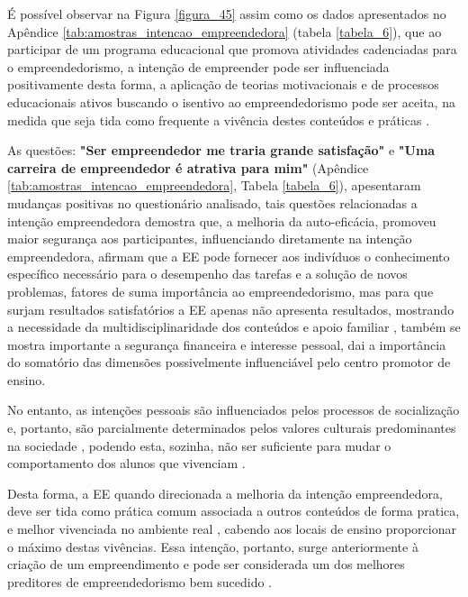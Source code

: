 É possível observar na Figura \ref{figura_45} assim como os dados apresentados no Apêndice \ref{tab:amostras_intencao_empreendedora} (tabela \ref{tabela_6}), que ao participar de um programa educacional que promova atividades cadenciadas para o empreendedorismo, a intenção de empreender pode ser influenciada positivamente desta forma, a aplicação de teorias motivacionais e de processos educacionais ativos buscando o isentivo ao empreendedorismo pode ser aceita, na medida que seja tida como frequente a vivência destes conteúdos e práticas \cite{fayolle_beyond_2014}.

As questões: \textbf{"Ser empreendedor me traria grande satisfação"} e \textbf{"Uma carreira de empreendedor é atrativa para mim"} (Apêndice \ref{tab:amostras_intencao_empreendedora}, Tabela \ref{tabela_6}), apesentaram mudanças positivas no questionário analisado, tais questões relacionadas a intenção empreendedora demostra que, a melhoria da auto-eficácia, promoveu maior segurança aos participantes, influenciando diretamente na intenção empreendedora,  afirmam que a EE pode fornecer aos indivíduos o conhecimento específico necessário para o desempenho das tarefas e a solução de novos problemas, fatores de suma importância ao empreendedorismo, mas para que surjam resultados satisfatórios a EE apenas não apresenta resultados, mostrando a necessidade da multidisciplinaridade dos conteúdos e apoio familiar \cite{edelman_impact_2016}, também se mostra importante a segurança financeira e interesse pessoal, dai a importância do somatório das dimensões possivelmente influenciável pelo centro promotor de ensino.


No entanto, as intenções pessoais são influenciados pelos processos de socialização e, portanto, são parcialmente determinados pelos valores culturais predominantes na sociedade \cite{schwartz_les_2006}, podendo esta, sozinha, não ser suficiente para mudar o comportamento dos alunos que vivenciam \cite{adelaja_students_2018}. 

Desta forma, a EE quando direcionada a melhoria da intenção empreendedora, deve ser tida como prática comum associada a outros conteúdos de forma pratica, e melhor vivenciada no ambiente real \cite{damanpour_phases_2006}, cabendo aos locais de ensino proporcionar o máximo destas vivências. Essa intenção, portanto, surge anteriormente  à criação de um empreendimento e pode ser considerada um dos melhores preditores de empreendedorismo bem sucedido \cite{ajzen_attitudes_1987,krueger_competing_2000,garcia-rodriguez_entrepreneurial_2017}.


